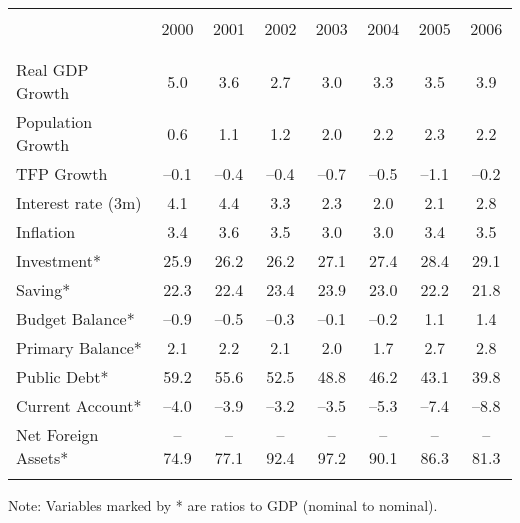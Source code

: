 \documentclass[letterpaper,12pt]{article}
\begin{document}
\begin{enumerate}
\begin{table}[h]
\vspace{1em}%
\centering%
\hspace{-3cm}%
\begin{minipage}
{0.52\textwidth}%
\begin{center}{\small
\begin{tabular}{lccccccc}%
\vspace{-0.6cm}\\
\hline%
\vspace{-.3cm}\\
                     & 2000  &  2001  &  2002   & 2003  & 2004 &  2005  &  2006 \\%
\vspace{-.3cm}\\
\hline%
\vspace{-.2cm}\\
Real GDP Growth      &  5.0   &   3.6  &   2.7   &  3.0  &  3.3  &   3.5  &  3.9 \\%
Population Growth    &  0.6   &   1.1  &    1.2  &  2.0  &  2.2  &   2.3  &  2.2 \\
TFP Growth           &  --0.1 &  --0.4 &   --0.4 &  --0.7&  --0.5&   --1.1&  --0.2\\%
Interest rate (3m)   &  4.1 &  4.4  &  3.3  &  2.3  & 2.0   &  2.1  &  2.8 \\
Inflation            &  3.4 &  3.6  &  3.5  &  3.0  &  3.0  &  3.4  &   3.5 \\
Investment*      &  25.9  &   26.2 &   26.2  &  27.1 &  27.4 &   28.4 &  29.1\\%
Saving*          &  22.3  &   22.4 &   23.4  &  23.9 &  23.0 &   22.2 &  21.8\\%
Budget Balance*       &  --0.9 &  --0.5 &   --0.3 &  --0.1&  --0.2&    1.1 &  1.4 \\%
Primary Balance*      &  2.1 &    2.2 &   2.1  &  2.0 &  1.7  &  2.7 &  2.8  \\%
Public Debt*          &  59.2  &  55.6  &   52.5  &  48.8 &  46.2 &   43.1 &  39.8\\%
Current Account*      &  --4.0 &  --3.9 &   --3.2 &  --3.5&  --5.3&   --7.4&  --8.8\\%
Net Foreign Assets*   & --74.9  & --77.1  & --92.4  & --97.2 & --90.1 & --86.3 &  --81.3 \\%
\hline%
\vspace{-3mm}\\
\end{tabular}
}
\end{center}
\end{minipage}
\end{table}
Note: Variables marked by * are ratios to GDP (nominal to nominal).  


\end{enumerate}
\end{document}
